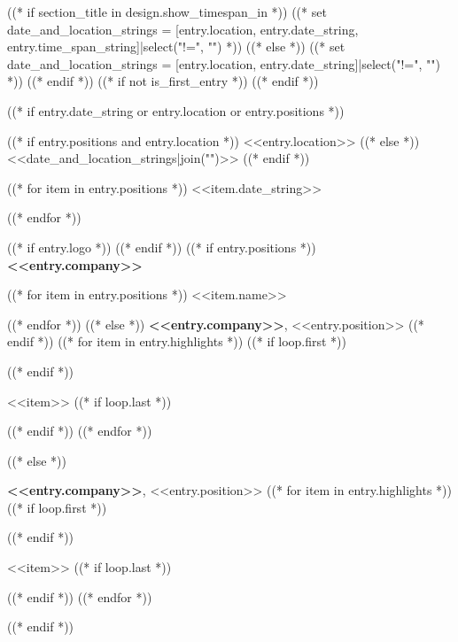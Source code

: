 ((* if section_title in design.show_timespan_in *))
    ((* set date_and_location_strings = [entry.location, entry.date_string, entry.time_span_string]|select("!=", "") *))
((* else *))
    ((* set date_and_location_strings = [entry.location, entry.date_string]|select("!=", "") *))
((* endif *))
((* if not is_first_entry *))
\vspace{<<design.margins.entry_area.vertical_between>>}
((* endif *))

((* if entry.date_string or entry.location or entry.positions *))
\begin{twocolentry}{
    ((* if entry.positions and entry.location *))
    <<entry.location>>
    ((* else *))
    <<date_and_location_strings|join("\n\n")>>
    ((* endif *))

    ((* for item in entry.positions *))
    <<item.date_string>>

    ((* endfor *))
}
    ((* if entry.logo *))
    ((* endif *))
    ((* if entry.positions *))
    \textbf{<<entry.company>>}

    ((* for item in entry.positions *))
    <<item.name>>

    ((* endfor *))
    ((* else *))
    \textbf{<<entry.company>>}, <<entry.position>>
    ((* endif *))
    ((* for item in entry.highlights *))
        ((* if loop.first *))
    \begin{highlights}
        ((* endif *))
        \item <<item>>
        ((* if loop.last *))
    \end{highlights}
        ((* endif *))
    ((* endfor *))
\end{twocolentry}
((* else *))
\begin{onecolentry}
    \textbf{<<entry.company>>}, <<entry.position>>
    ((* for item in entry.highlights *))
        ((* if loop.first *))
    \begin{highlights}
        ((* endif *))
        \item <<item>>
        ((* if loop.last *))
    \end{highlights}
        ((* endif *))
    ((* endfor *))
\end{onecolentry}
((* endif *))